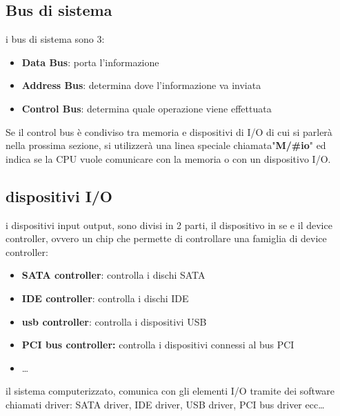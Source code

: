\documentclass{article}
\begin{document}
    \subsection{Bus di sistema}
        i bus di sistema sono 3:

        \begin{itemize}
            \item \textbf{Data Bus}:
            porta l'informazione

            \item \textbf{Address Bus}:
            determina dove l'informazione va inviata

            \item \textbf{Control Bus}:
            determina quale operazione viene effettuata
        \end{itemize}
%
        Se il control bus è condiviso tra memoria e dispositivi di I/O di cui si parlerà nella prossima sezione, si utilizzerà una linea speciale chiamata"\textbf{M/\#io}" ed indica se la CPU vuole comunicare con la memoria o con un dispositivo I/O.

    \subsection{dispositivi I/O}
        i dispositivi input output, sono divisi in 2 parti, il dispositivo in se e il device controller, ovvero un chip che permette di controllare una famiglia di device controller:

        \begin{itemize}
            \item \textbf{SATA controller}:
            controlla i dischi SATA
            
            \item \textbf{IDE controller}:
            controlla i dischi IDE
            
            \item \textbf{usb controller}:
            controlla i dispositivi USB
            
            \item \textbf{PCI bus controller:} controlla i dispositivi connessi al bus PCI
            \item \ldots
        \end{itemize}
        il sistema computerizzato, comunica con gli elementi I/O tramite dei software chiamati driver: SATA driver, IDE driver, USB driver, PCI bus driver ecc\ldots
\end{document}

